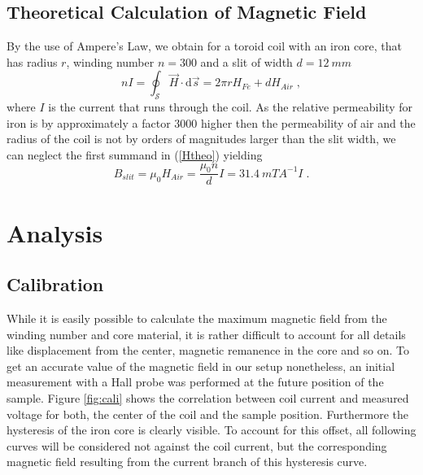 \documentclass[a4paper]{scrartcl}
\numberwithin{equation}{section}
\numberwithin{figure}{section}
\numberwithin{table}{section}
\newcommand{\eq}[2]{\begin{equation}#1\label{#2}\end{equation}}
\newcommand{\Formel}[1]{(\ref{#1})}
\begin{document}
\subsection{Theoretical Calculation of Magnetic Field}
By the use of Ampere's Law, we obtain for a toroid coil with an iron core, that has radius $r$, winding number $n=300$ and a slit of width $d=\SI{12}{mm}$
\eq{nI=\oint_{\mathcal S} \vec{H} \cdot \mathrm{d}\vec{s} = 2 \pi r H_{Fe} + d H_{Air} \;, }{Htheo}
where $I$ is the current that runs through the coil. As the relative permeability for iron is by approximately a factor $3000$ higher then the permeability of air and the radius of the coil is not by orders of magnitudes larger than the slit width, we can neglect the first summand in \Formel{Htheo} yielding
\eq{B_{slit} =  \mu_0  H_{Air}= \frac{\mu_0 n}{d} I = \SI{31.4}{mT A^{-1}} I \; .}{}

 
 
\section{Analysis}
\subsection{Calibration}
\label{sec:cali}
While it is easily possible to calculate the maximum magnetic field from the winding number and core material, it is rather difficult to account for all details like displacement from the center, magnetic remanence in the core and so on. To get an accurate value of the magnetic field in our setup nonetheless, an initial measurement with a Hall probe was performed at the future position of the sample. Figure \ref{fig:cali} shows the correlation between coil current and measured voltage for both, the center of the coil and the sample position. Furthermore the hysteresis of the iron core is clearly visible. To account for this offset, all following curves will be considered not against the coil current, but the corresponding magnetic field resulting from the current branch of this hysteresis curve.
\end{document}
